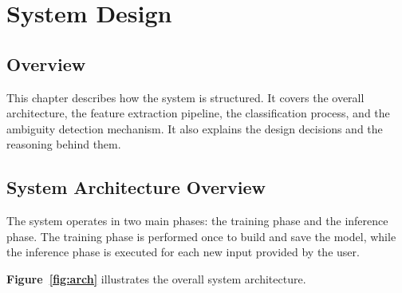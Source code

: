 \chapter{System Design}

\section{Overview}

This chapter describes how the system is structured. It covers the overall architecture, the
feature extraction pipeline, the classification process, and the ambiguity detection mechanism.
It also explains the design decisions and the reasoning behind them.

\section{System Architecture Overview}

The system operates in two main phases: the training phase and the inference phase. The
training phase is performed once to build and save the model, while the inference phase is
executed for each new input provided by the user.

\textbf{Figure~\ref{fig:arch}} illustrates the overall system architecture.

